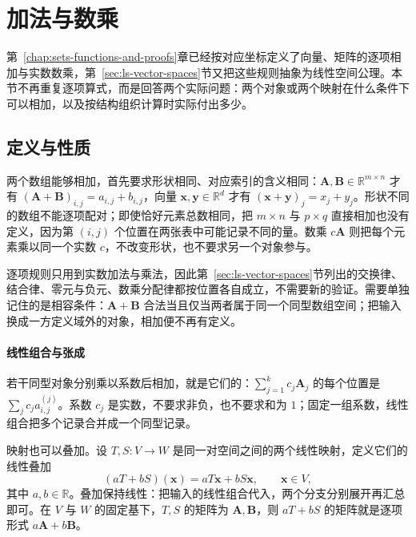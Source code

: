 
\section{加法与数乘}
\label{sec:ls-addition-scaling}

第~\ref{chap:sets-functions-and-proofs}章已经按对应坐标定义了向量、矩阵的逐项相加与实数数乘，第~\ref{sec:ls-vector-spaces}节又把这些规则抽象为线性空间公理。本节不再重复逐项算式，而是回答两个实际问题：两个对象或两个映射在什么条件下可以相加，以及按结构组织计算时实际付出多少。

\subsection{定义与性质}

两个数组能够相加，首先要求形状相同、对应索引的含义相同：$\bm A,\bm B\in\mathbb R^{m\times n}$ 才有 $(\bm A+\bm B)_{i,j}=a_{i,j}+b_{i,j}$，向量 $\bm x,\bm y\in\mathbb R^d$ 才有 $(\bm x+\bm y)_j=x_j+y_j$。形状不同的数组不能逐项配对；即使恰好元素总数相同，把 $m\times n$ 与 $p\times q$ 直接相加也没有定义，因为第 $(i,j)$ 个位置在两张表中可能记录不同的量。数乘 $c\bm A$ 则把每个元素乘以同一个实数 $c$，不改变形状，也不要求另一个对象参与。

逐项规则只用到实数加法与乘法，因此第~\ref{sec:ls-vector-spaces}节列出的交换律、结合律、零元与负元、数乘分配律都按位置各自成立，不需要新的验证。需要单独记住的是相容条件：$\bm A+\bm B$ 合法当且仅当两者属于同一个同型数组空间；把输入换成一方定义域外的对象，相加便不再有定义。

\paragraph{线性组合与张成}
\label{sec:linear-algebra-map-addition}

若干同型对象分别乘以系数后相加，就是它们的：$\sum_{j=1}^k c_j\bm A_j$ 的每个位置是 $\sum_j c_j a_{i,j}^{(j)}$。系数 $c_j$ 是实数，不要求非负，也不要求和为 $1$；固定一组系数，线性组合把多个记录合并成一个同型记录。

映射也可以叠加。设 $T,S:V\to W$ 是同一对空间之间的两个线性映射，定义它们的线性叠加
\[
 (aT+bS)(\bm x)=aT\bm x+bS\bm x,\qquad \bm x\in V,
\]
其中 $a,b\in\mathbb R$。叠加保持线性：把输入的线性组合代入，两个分支分别展开再汇总即可。在 $V$ 与 $W$ 的固定基下，$T,S$ 的矩阵为 $\bm A,\bm B$，则 $aT+bS$ 的矩阵就是逐项形式 $a\bm A+b\bm B$。


